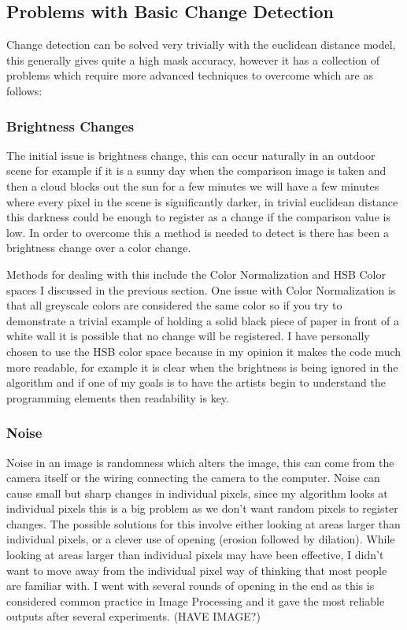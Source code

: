 \documentclass[a4paper]{report}
\begin{document}
\subsection{Problems with Basic Change Detection}
Change detection can be solved very trivially with the euclidean distance model, this generally gives quite a high mask accuracy, however it has a collection of problems which require more advanced techniques to overcome which are as follows:

\subsubsection{Brightness Changes}
The initial issue is brightness change, this can occur naturally in an outdoor scene for example if it is a sunny day when the comparison image is taken and then a cloud blocks out the sun for a few minutes we will have a few minutes where every pixel in the scene is significantly darker, in trivial euclidean distance this darkness could be enough to register as a change if the comparison value is low. In order to overcome this a method is needed to detect is there has been a brightness change over a color change.

Methods for dealing with this include the Color Normalization and HSB Color spaces I discussed in the previous section. One issue with Color Normalization is that all greyscale colors are considered the same color so if you try to demonstrate a trivial example of holding a solid black piece of paper in front of a white wall it is possible that no change will be registered. I have personally chosen to use the HSB color space because in my opinion it makes the code much more readable, for example it is clear when the brightness is being ignored in the algorithm and if one of my goals is to have the artists begin to understand the programming elements then readability is key.

\subsubsection{Noise}
Noise in an image is randomness which alters the image, this can come from the camera itself or the wiring connecting the camera to the computer. Noise can cause small but sharp changes in individual pixels, since my algorithm looks at individual pixels this is a big problem as we don't want random pixels to register changes. The possible solutions for this involve either looking at areas larger than individual pixels, or a clever use of opening (erosion followed by dilation). While looking at areas larger than individual pixels may have been effective, I didn't want to move away from the individual pixel way of thinking that most people are familiar with. I went with several rounds of opening in the end as this is considered common practice in Image Processing and it gave the most reliable outputs after several experiments. (HAVE IMAGE?)
\end{document}
